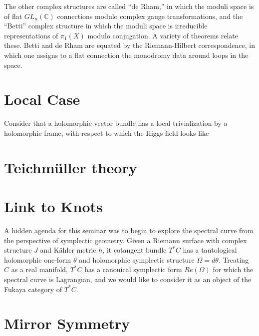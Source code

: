The other complex structures are called ``de Rham,'' in which the moduli space is of flat
$GL_n(\mathbb C)$ connections modulo complex gauge transformations, and the ``Betti'' complex
structure in which the moduli space is irreducible representations of $\pi_1(X)$ modulo conjugation.
A variety of theorems relate these.  Betti and de Rham are equated by the Riemann-Hilbert
correspondence, in which one assigns to a flat connection the monodromy data around loops in the space.

\section{Local Case}

Consider that a holomorphic vector bundle has a local trivialization by a holomorphic frame,
with respect to which the Higgs field looks like 

\section{Teichm\"uller theory}

\section{Link to Knots}

A hidden agenda for this seminar was to begin to explore the spectral curve from the perspective
of symplectic geometry.  Given a Riemann surface with complex structure $J$ and K\"ahler metric $h$,
it cotangent bundle $T^*C$ has a tautological holomorphic one-form $\theta$ and
holomorphic symplectic structure $\Omega = d\theta$.  
Treating $C$ as a real manifold, $T^*C$ has a canonical symplectic form $Re(\Omega)$
for which the spectral curve is Lagrangian, and we would like to consider it as an
object of the Fukaya category of $T^*C.$




%

\section{Mirror Symmetry}

